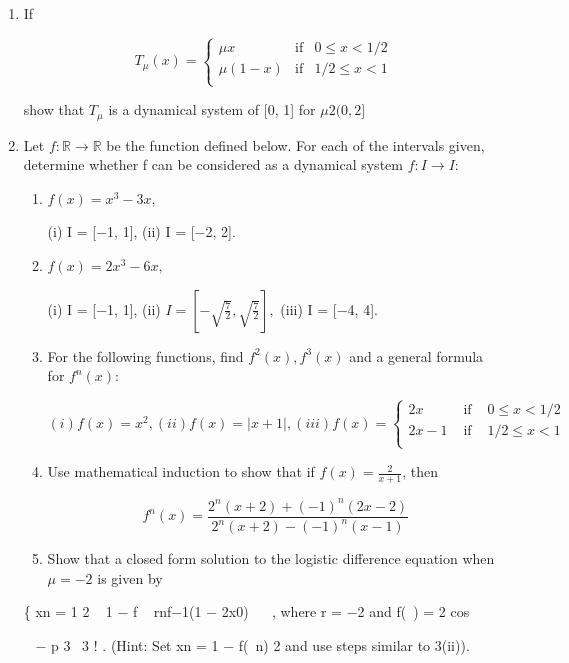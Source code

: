 \documentclass[12pt]{article}
\begin{document}
\begin{enumerate}
\begin{enumerate}
\item If 

\[
T_{\mu}(x) =  \left\{\begin{matrix}
\mu x & \text{if} & 0 \leq x < 1/2  \\
\mu(1-x) & \text{if} & 1/2 \leq x <1  \\
\end{matrix}\right.
\]

show that $T_{\mu}$ is a dynamical system of
[0, 1] for $\mu 2 (0, 2]$

\item Let $f: \mathbb{R}  \to \mathbb{R} $ be the function defined below. For each of the intervals given,
determine whether f can be considered as a dynamical system $f : I \to  I$:

\begin{enumerate}
\item $f(x) = x^3 − 3x$,

\hfill

(i) I = [−1, 1], (ii) I = [−2, 2].

\item $f(x) = 2x^3 − 6x,$

\hfill

(i) I = [−1, 1], (ii) $I = [- \sqrt{\frac{7}{2}}, \sqrt{\frac{7}{2}}],$
 (iii) I = [−4, 4].
 
\item For the following functions, find $f^2(x), f^3(x)$ and a general formula for $f^n(x)$:

\[
(i) f(x)=x^2, (ii) f(x) = |x+1|, (iii) f(x) = \left\{\begin{matrix}
2x & \text{ if }  & 0 \leq x < 1/2 \\
2x-1 & \text{ if }  & 1/2 \leq x < 1 \\
\end{matrix}\right.
\]

\item Use mathematical induction to show that if $f(x) = \frac{2}{x+1}$, then

\[
f^n(x) = \frac{2^n(x + 2) + (-1)^n(2x − 2)}{2^n(x + 2) - (-1)^n(x - 1)}
\]

\item Show that a closed form solution to the logistic difference equation when $\mu = -2$
is given by
\end{enumerate}

\{
xn =
1
2
 
1 − f
 
rnf−1(1 − 2x0)
  
, where r = −2 and f( ) = 2 cos
 
  −
p
3 
3
!
.
(Hint: Set xn =
1 − f( n)
2
and use steps similar to 3(ii)).


\end{enumerate}
\end{enumerate}
\end{document}
